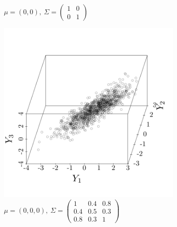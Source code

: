 \documentclass[twoside,openright]{report}
\begin{document}
\begin{figure}[ht!]
\begin{subfigure}[b]{0.34\textwidth}
                \caption{$\mu = (0,0),\ \Sigma= \left(\begin{smallmatrix} 1&0\\0&1 \end{smallmatrix} \right) $}
        \end{subfigure}
        \begin{subfigure}[b]{0.34\textwidth}
                \includegraphics[width=\textwidth]{figures/ch1_gaussvec3}
                \caption{$\mu = (0,0,0),\ \Sigma= \left(\begin{smallmatrix} 1&0.4&0.8 \\ 0.4&0.5&0.3 \\ 0.8 & 0.3 & 1 \end{smallmatrix} \right) $}
        \end{subfigure}%
        \hspace{1cm}       
        \begin{subfigure}[b]{0.34\textwidth}

\end{subfigure}
\end{figure}
\end{document}
